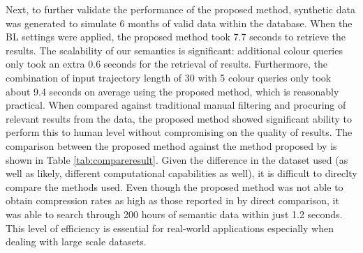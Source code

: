 Next, to further validate the performance of the proposed method, synthetic data was generated to simulate 6 months of valid data within the database. When the BL settings were applied, the proposed method took 7.7 seconds to retrieve the results. The scalability of our semantics is significant: additional colour queries only took an extra 0.6 seconds for the retrieval of results. Furthermore, the combination of input trajectory length of 30 with 5 colour queries only took about 9.4 seconds on average using the proposed method, which is reasonably practical. When compared against traditional manual filtering and procuring of relevant results from the data, the proposed method showed significant ability to perform this to human level without compromising on the quality of results. %
The comparison between the proposed method against the method proposed by  is shown in Table \ref{tab:compareresult}. Given the difference in the dataset used (as well as likely, different computational capabilities as well), it is difficult to direclty compare the methods used. Even though the proposed method was not able to obtain compression rates as high as those reported in  by direct comparison, it was able to search through 200 hours of semantic data within just 1.2 seconds. This level of efficiency is essential for real-world applications especially when dealing with large scale datasets.
